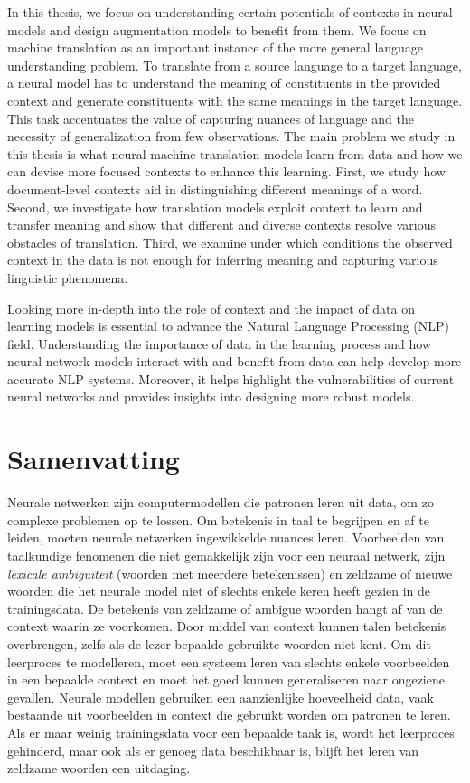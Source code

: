 In this thesis, we focus on understanding certain potentials of contexts in neural models and design augmentation models to benefit from them. 
We focus on machine translation as an important instance of the more general language understanding problem. 
To translate from a source language to a target language, a neural model has to understand the meaning of constituents in the provided context and generate constituents with the same meanings in the target language.
This task accentuates the value of capturing nuances of language and the necessity of generalization from few observations.
The main problem we study in this thesis is what neural machine translation models learn from data and how we can devise more focused contexts to enhance this learning.
First, we study how document-level contexts aid in distinguishing different meanings of a word. 
Second, we investigate how translation models exploit context to learn and transfer meaning and show that different and diverse contexts resolve various obstacles of translation.
Third, we examine under which conditions the observed context in the data is not enough for inferring meaning and capturing various linguistic phenomena. 

Looking more in-depth into the role of context and the impact of data on learning models is essential to advance the Natural Language Processing (NLP) field. 
Understanding the importance of data in the learning process and how neural network models interact with and benefit from data can help develop more accurate NLP systems. 
Moreover, it helps highlight the vulnerabilities of current neural networks and provides insights into designing more robust models.

\chapter{Samenvatting}

Neurale netwerken zijn computermodellen die patronen leren uit data, om zo complexe problemen op te lossen.
Om betekenis in taal te begrijpen en af te leiden, moeten neurale netwerken ingewikkelde nuances leren.
Voorbeelden van taalkundige fenomenen die niet gemakkelijk zijn voor een neuraal netwerk, zijn 
\textit{lexicale ambigu\"{i}teit} (woorden met meerdere betekenissen) en zeldzame of nieuwe woorden die het neurale model niet of slechts enkele keren heeft gezien in de trainingsdata.
%
De betekenis van zeldzame of ambigue woorden hangt af van de context waarin ze voorkomen. Door middel van context kunnen talen betekenis overbrengen, zelfs als de lezer bepaalde gebruikte woorden niet kent.
Om dit leerproces te modelleren, moet een systeem leren van slechts enkele voorbeelden in een bepaalde context en moet het goed kunnen generaliseren naar ongeziene gevallen.
Neurale modellen gebruiken een aanzienlijke hoeveelheid data, vaak bestaande uit voorbeelden in context die gebruikt worden om patronen te leren.
Als er maar weinig trainingsdata voor een bepaalde taak is, wordt het leerproces gehinderd, maar ook als er genoeg data beschikbaar is, blijft het leren van zeldzame woorden een uitdaging.


